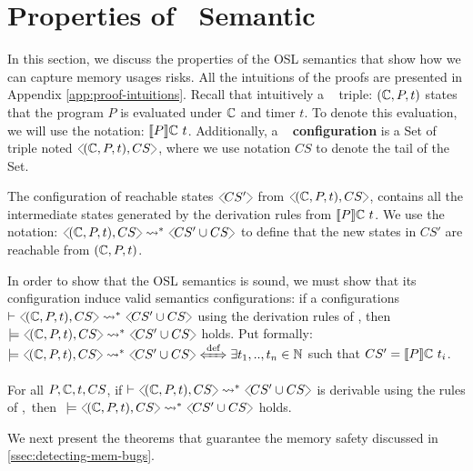 \section{Properties of \oslos~Semantic}
\label{sec:properties}

In this section, we discuss the properties of the OSL semantics that show how we can capture memory usages risks. All the intuitions of the proofs are presented in Appendix \ref{app:proof-intuitions}. Recall that intuitively a \oslos~ triple: $(\mathbb{C}, P,t)$ states that the program $P$ is evaluated under $\mathbb{C}$ and timer $t$. To denote this evaluation, we will use the notation: $\llbracket P \rrbracket \mathbb{C}~t$. Additionally, a \oslos~ \textbf{configuration} is a Set of triple noted $\cfg{(\confosl, P,t), CS}$, where we use notation $CS$ to denote the tail of the Set.

\begin{definition}
\label{def:reachablestates}
The configuration of reachable states $\\ \cfg{CS'}$ from $\cfg{(\confosl, P, t), CS}$, contains all the intermediate states generated by the derivation rules from $\llbracket P \rrbracket \mathbb{C}~t$.
 We use the notation: $\cfg{(\confosl, P, t), CS}\rightsquigarrow^* \cfg{CS' \cup CS}$ to define that the new states in $CS'$ are reachable from $(\mathbb{C}, P, t)$.
\end{definition}

In order to show that the OSL semantics is sound, we must show that its configuration induce valid semantics configurations: if a configurations $\vdash \cfg{(\confosl, P, t), CS}\rightsquigarrow^* \cfg{CS' \cup CS}$ using the derivation rules of \oslos, then $\models \cfg{(\confosl, P, t), CS} \rightsquigarrow^* \cfg{CS' \cup CS}$ holds. Put formally: $\models \cfg{(\confosl, P, t), CS} \rightsquigarrow^* \cfg{CS' \cup CS} \xLeftrightarrow{\text{def}} \exists t_1,.., t_n \in \mathbb{N}$ such that $CS' = \llbracket P \rrbracket \mathbb{C}~t_i$.

\begin{theorem}[Soundness]
\label{thm:soundness}
For all $P, \mathbb{C}, t, CS$, if $\vdash \cfg{(\confosl, P, t), CS}\rightsquigarrow^* \cfg{CS' \cup CS}$ is derivable using the rules of \oslos,~then $~\models \cfg{(\confosl, P, t), CS}\rightsquigarrow^* \cfg{CS' \cup CS}$ holds.
\end{theorem}

We next present the theorems that guarantee the memory safety discussed in \autoref{ssec:detecting-mem-bugs}.


